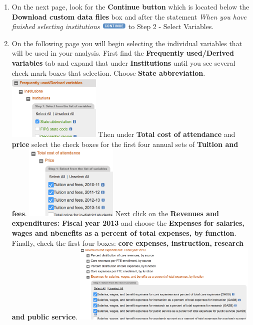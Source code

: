 \documentclass{article}
\begin{document}
{\begin{enumerate}[leftmargin=15mm]
\item On the next page, look for the \textbf{Continue button} which is located below the \textbf{Download custom data files} box and after the statement \textit{When you have finished selecting institutions} \includegraphics[width=0.1\textwidth]{continue.png} to Step 2 - Select Variables.

\item On the following page you will begin selecting the individual variables that will be used in your analysis.  First find the \textbf{Frequently used/Derived variables} tab and expand that under \textbf{Institutions} until you see several check mark boxes that selection.  Choose \textbf{State abbreviation}. \includegraphics[width=0.35\textwidth]{state.png} Then under \textbf{Total cost of attendance} and \textbf{price} select the check boxes for the first four annual sets of \textbf{Tuition and fees}. \includegraphics[width=0.35\textwidth]{cost.png}  Next click on the \textbf{Revenues and expenditures: Fiscal year 2013} and choose the \textbf{Expenses for salaries, wages and nbenefits as a percent of total expenses, by function}.  Finally, check the first four boxes: \textbf{core expenses, instruction, research and public service}. \includegraphics[width=0.7\textwidth]{core.png}


\end{enumerate}}
\end{document}
